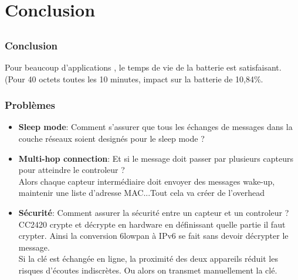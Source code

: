\section{Conclusion}
\subsection{}
\begin{frame}
 \frametitle{Conclusion}
 Pour beaucoup d'applications , le temps de vie de la batterie est satisfaisant.\\
 (Pour 40 octets toutes les 10 minutes, impact sur la batterie de 10,84\%.
\end{frame}

\begin{frame}
 \frametitle{Problèmes}
 \begin{itemize}
  \item \textbf{Sleep mode}: Comment s'assurer que tous les échanges de messages dans la couche réseaux soient designés pour le sleep mode ?
  \item \textbf{Multi-hop connection}: Et si le message doit passer par plusieurs capteurs pour atteindre le controleur ?\\
  Alors chaque capteur intermédiaire doit envoyer des messages wake-up, maintenir une liste d'adresse MAC...Tout cela va créer de l'overhead
  \item \textbf{Sécurité}: Comment assurer la sécurité entre un capteur et un controleur ?\\
  CC2420 crypte et décrypte en hardware en définissant quelle partie il faut crypter.
  Ainsi la conversion 6lowpan à IPv6 se fait sans devoir décrypter le message.\\
  Si la clé est échangée en ligne, la proximité des deux appareils réduit les risques d'écoutes indiscrètes.
  Ou alors on transmet manuellement la clé.
 \end{itemize}
\end{frame}

